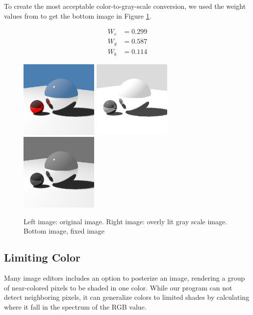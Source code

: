 \documentclass{acmsiggraph}
\begin{document}
To create the most acceptable color-to-gray-scale conversion, we used the
weight values from \cite{mw11ASCU} to get the bottom image in Figure
\ref{gray_scale}.

\begin{align}
W_{r} &= 0.299 \\
W_{g} &= 0.587 \\
W_{b} &= 0.114
\end{align}

\begin{figure}[htp]
\centering
\includegraphics[width=1.5in]{original_color}
\includegraphics[width=1.5in]{overly_lit_gray_scale}
\includegraphics[width=1.5in]{normal_gray_scale}
\caption{Left image: original image. Right image: overly lit gray scale image.
Bottom image, fixed image}
\label{gray_scale}
\end{figure}



\subsection{Limiting Color}
Many image editors includes an option to posterize an image, rendering a group
of near-colored pixels to be shaded in one color.  While our program can not
detect neighboring pixels, it can generalize colors to limited shades by
calculating where it fall in the spectrum of the RGB value.
\end{document}

